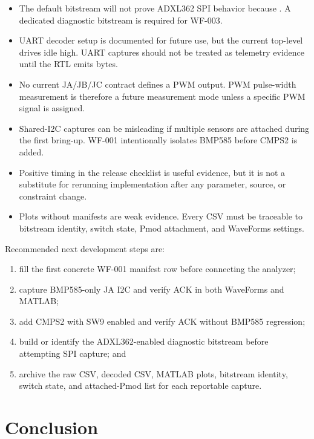 \documentclass[11pt]{article}
\newcommand{\sig}[1]{\texttt{\detokenize{#1}}}
\newcommand{\param}[1]{\texttt{\detokenize{#1}}}
\begin{document}
\begin{itemize}[leftmargin=*]
  \item The default bitstream will not prove ADXL362 SPI behavior because
        \param{USE_ADXL362_SPI_ACC=0}.  A dedicated diagnostic bitstream is
        required for WF-003.
  \item UART decoder setup is documented for future use, but the current
        top-level drives \sig{cls_tx} idle high.  UART captures should not be
        treated as telemetry evidence until the RTL emits bytes.
  \item No current JA/JB/JC contract defines a PWM output.  PWM pulse-width
        measurement is therefore a future measurement mode unless a specific PWM
        signal is assigned.
  \item Shared-I2C captures can be misleading if multiple sensors are attached
        during the first bring-up.  WF-001 intentionally isolates BMP585 before
        CMPS2 is added.
  \item Positive timing in the release checklist is useful evidence, but it is
        not a substitute for rerunning implementation after any parameter,
        source, or constraint change.
  \item Plots without manifests are weak evidence.  Every CSV must be traceable
        to bitstream identity, switch state, Pmod attachment, and WaveForms
        settings.
\end{itemize}

Recommended next development steps are:

\begin{enumerate}[leftmargin=*]
  \item fill the first concrete WF-001 manifest row before connecting the
        analyzer;
  \item capture BMP585-only JA I2C and verify \sig{0x47} ACK in both WaveForms
        and MATLAB;
  \item add CMPS2 with SW9 enabled and verify \sig{0x30} ACK without BMP585
        regression;
  \item build or identify the ADXL362-enabled diagnostic bitstream before
        attempting SPI capture; and
  \item archive the raw CSV, decoded CSV, MATLAB plots, bitstream identity,
        switch state, and attached-Pmod list for each reportable capture.
\end{enumerate}

\section{Conclusion}
\label{sec:conclusion}
\end{document}
